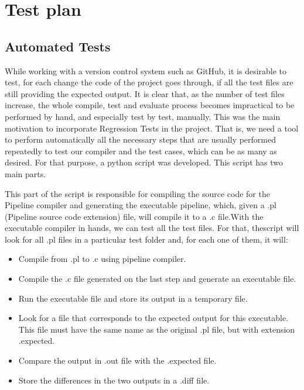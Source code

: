 \documentclass[./Report_main.tex]{subfiles}
\begin{document}


\chapter{Test plan}
\section{Automated Tests}
While working with a version control system such as GitHub, it is desirable to test, for each change the code of the project goes through, if all the test files are still providing the expected
output.
It is clear that, as the number of test files increase, the whole compile, test and evaluate
process becomes impractical to be performed by hand, and especially test by test, manually.
This was the main motivation to incorporate Regression Tests in the project. That is, we
need a tool to perform automatically all the necessary steps that are usually performed
repeatedly to test our compiler and the test cases, which can be as many as desired.
For that purpose, a python script was developed. This script has two main parts.

This part of the script is responsible for compiling the source code for the Pipeline
compiler and generating the executable pipeline, which, given a .pl (Pipeline source code extension) file, will compile it to a .c file.With the executable compiler in hands, we can test all the test files. For that, thescript will look for all .pl files in a particular test folder and, for each one of them, it will:

\begin{itemize}
    \item Compile from .pl to .c using pipeline compiler.
    \item Compile the .c file generated on the last step and generate an executable file.
    \item Run the executable file and store its output in a temporary file.
    \item Look for a file that corresponds to the expected output for this executable. This file must have the same name as the original .pl file, but with extension .expected.
    \item Compare the output in .out file with the .expected file.
    \item Store the differences in the two outputs in a .diff file.
\end{itemize}
\end{document}
